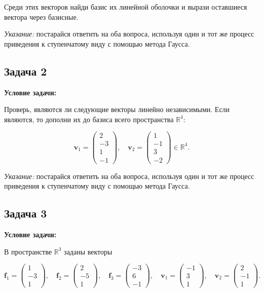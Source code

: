 \documentclass[a4paper,12pt]{article}
\begin{document}
Среди этих векторов найди базис их линейной оболочки и вырази оставшиеся вектора через базисные.

\textit{Указание:} постарайся ответить на оба вопроса, используя один и тот же процесс приведения к ступенчатому виду с помощью метода Гаусса.

\vspace{0.5cm}

\subsection{Задача 2}

\textbf{Условие задачи:}

Проверь, являются ли следующие векторы линейно независимыми. Если являются, то дополни их до базиса всего пространства $\mathbb{R}^4$:

\[
\mathbf{v}_1 = \begin{pmatrix}2 \\ -3 \\ 1 \\ -1\end{pmatrix},\quad
\mathbf{v}_2 = \begin{pmatrix}1 \\ -1 \\ 3 \\ -2\end{pmatrix} \in \mathbb{R}^4.
\]

\textit{Указание:} постарайся ответить на оба вопроса, используя один и тот же процесс приведения к ступенчатому виду с помощью метода Гаусса.

\vspace{0.5cm}

\subsection{Задача 3}

\textbf{Условие задачи:}

В пространстве $\mathbb{R}^3$ заданы векторы

\[
\mathbf{f}_1 = \begin{pmatrix}1 \\ -3 \\ 1\end{pmatrix},\quad
\mathbf{f}_2 = \begin{pmatrix}2 \\ -5 \\ 1\end{pmatrix},\quad
\mathbf{f}_3 = \begin{pmatrix}-3 \\ 6 \\ -1\end{pmatrix},\quad
\mathbf{v}_1 = \begin{pmatrix}-1 \\ 3 \\ 1\end{pmatrix},\quad
\mathbf{v}_2 = \begin{pmatrix}2 \\ -1 \\ 1\end{pmatrix}.
\]
\end{document}
